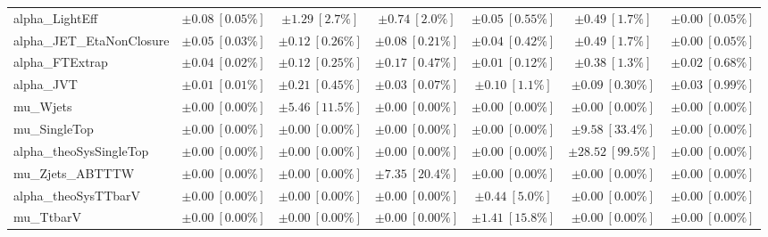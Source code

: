 \begin{sidewaystable}
\begin{center}
\begin{tabular*}{\textwidth}{@{\extracolsep{\fill}}lcccccc}
alpha\_LightEff         & $\pm 0.08\ [0.05\%] $          & $\pm 1.29\ [2.7\%] $          & $\pm 0.74\ [2.0\%] $          & $\pm 0.05\ [0.55\%] $          & $\pm 0.49\ [1.7\%] $          & $\pm 0.00\ [0.05\%] $       \\
alpha\_JET\_EtaNonClosure         & $\pm 0.05\ [0.03\%] $          & $\pm 0.12\ [0.26\%] $          & $\pm 0.08\ [0.21\%] $          & $\pm 0.04\ [0.42\%] $          & $\pm 0.49\ [1.7\%] $          & $\pm 0.00\ [0.05\%] $       \\
alpha\_FTExtrap         & $\pm 0.04\ [0.02\%] $          & $\pm 0.12\ [0.25\%] $          & $\pm 0.17\ [0.47\%] $          & $\pm 0.01\ [0.12\%] $          & $\pm 0.38\ [1.3\%] $          & $\pm 0.02\ [0.68\%] $       \\
alpha\_JVT         & $\pm 0.01\ [0.01\%] $          & $\pm 0.21\ [0.45\%] $          & $\pm 0.03\ [0.07\%] $          & $\pm 0.10\ [1.1\%] $          & $\pm 0.09\ [0.30\%] $          & $\pm 0.03\ [0.99\%] $       \\
mu\_Wjets         & $\pm 0.00\ [0.00\%] $          & $\pm 5.46\ [11.5\%] $          & $\pm 0.00\ [0.00\%] $          & $\pm 0.00\ [0.00\%] $          & $\pm 0.00\ [0.00\%] $          & $\pm 0.00\ [0.00\%] $       \\
mu\_SingleTop         & $\pm 0.00\ [0.00\%] $          & $\pm 0.00\ [0.00\%] $          & $\pm 0.00\ [0.00\%] $          & $\pm 0.00\ [0.00\%] $          & $\pm 9.58\ [33.4\%] $          & $\pm 0.00\ [0.00\%] $       \\
alpha\_theoSysSingleTop         & $\pm 0.00\ [0.00\%] $          & $\pm 0.00\ [0.00\%] $          & $\pm 0.00\ [0.00\%] $          & $\pm 0.00\ [0.00\%] $          & $\pm 28.52\ [99.5\%] $          & $\pm 0.00\ [0.00\%] $       \\
mu\_Zjets\_ABTTTW         & $\pm 0.00\ [0.00\%] $          & $\pm 0.00\ [0.00\%] $          & $\pm 7.35\ [20.4\%] $          & $\pm 0.00\ [0.00\%] $          & $\pm 0.00\ [0.00\%] $          & $\pm 0.00\ [0.00\%] $       \\
alpha\_theoSysTTbarV         & $\pm 0.00\ [0.00\%] $          & $\pm 0.00\ [0.00\%] $          & $\pm 0.00\ [0.00\%] $          & $\pm 0.44\ [5.0\%] $          & $\pm 0.00\ [0.00\%] $          & $\pm 0.00\ [0.00\%] $       \\
mu\_TtbarV         & $\pm 0.00\ [0.00\%] $          & $\pm 0.00\ [0.00\%] $          & $\pm 0.00\ [0.00\%] $          & $\pm 1.41\ [15.8\%] $          & $\pm 0.00\ [0.00\%] $          & $\pm 0.00\ [0.00\%] $       \\

\end{tabular*}
\end{center}
\end{sidewaystable}
